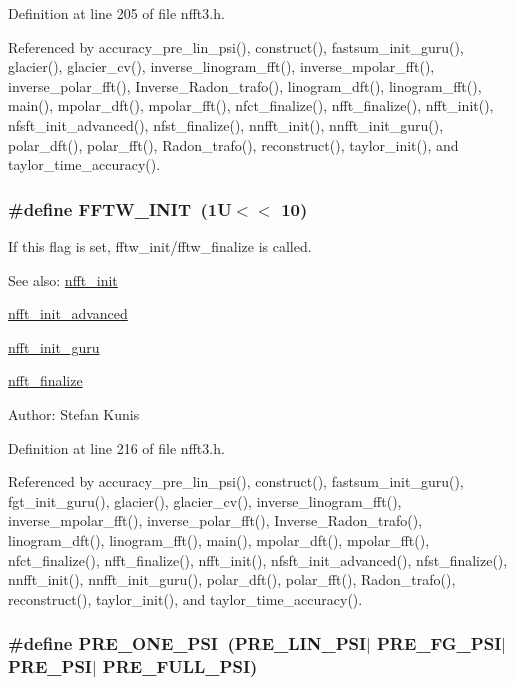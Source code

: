 Definition at line 205 of file nfft3.h.

Referenced by accuracy\_\-pre\_\-lin\_\-psi(), construct(), fastsum\_\-init\_\-guru(), glacier(), glacier\_\-cv(), inverse\_\-linogram\_\-fft(), inverse\_\-mpolar\_\-fft(), inverse\_\-polar\_\-fft(), Inverse\_\-Radon\_\-trafo(), linogram\_\-dft(), linogram\_\-fft(), main(), mpolar\_\-dft(), mpolar\_\-fft(), nfct\_\-finalize(), nfft\_\-finalize(), nfft\_\-init(), nfsft\_\-init\_\-advanced(), nfst\_\-finalize(), nnfft\_\-init(), nnfft\_\-init\_\-guru(), polar\_\-dft(), polar\_\-fft(), Radon\_\-trafo(), reconstruct(), taylor\_\-init(), and taylor\_\-time\_\-accuracy().\hypertarget{group__nfft_ga26}{
\subsubsection[FFTW\_\-INIT]{\setlength{\rightskip}{0pt plus 5cm}\#define FFTW\_\-INIT~(1U$<$$<$ 10)}}
\label{group__nfft_ga26}


If this flag is set, fftw\_\-init/fftw\_\-finalize is called. 

\begin{Desc}
\item[See also:]\hyperlink{group__nfft_ga7}{nfft\_\-init} 

\hyperlink{group__nfft_ga8}{nfft\_\-init\_\-advanced} 

\hyperlink{group__nfft_ga9}{nfft\_\-init\_\-guru} 

\hyperlink{group__nfft_ga15}{nfft\_\-finalize} \end{Desc}
\begin{Desc}
\item[Author:]Stefan Kunis \end{Desc}


Definition at line 216 of file nfft3.h.

Referenced by accuracy\_\-pre\_\-lin\_\-psi(), construct(), fastsum\_\-init\_\-guru(), fgt\_\-init\_\-guru(), glacier(), glacier\_\-cv(), inverse\_\-linogram\_\-fft(), inverse\_\-mpolar\_\-fft(), inverse\_\-polar\_\-fft(), Inverse\_\-Radon\_\-trafo(), linogram\_\-dft(), linogram\_\-fft(), main(), mpolar\_\-dft(), mpolar\_\-fft(), nfct\_\-finalize(), nfft\_\-finalize(), nfft\_\-init(), nfsft\_\-init\_\-advanced(), nfst\_\-finalize(), nnfft\_\-init(), nnfft\_\-init\_\-guru(), polar\_\-dft(), polar\_\-fft(), Radon\_\-trafo(), reconstruct(), taylor\_\-init(), and taylor\_\-time\_\-accuracy().\hypertarget{group__nfft_ga27}{
\subsubsection[PRE\_\-ONE\_\-PSI]{\setlength{\rightskip}{0pt plus 5cm}\#define PRE\_\-ONE\_\-PSI~(PRE\_\-LIN\_\-PSI$|$ PRE\_\-FG\_\-PSI$|$ PRE\_\-PSI$|$ PRE\_\-FULL\_\-PSI)}}
\label{group__nfft_ga27}


